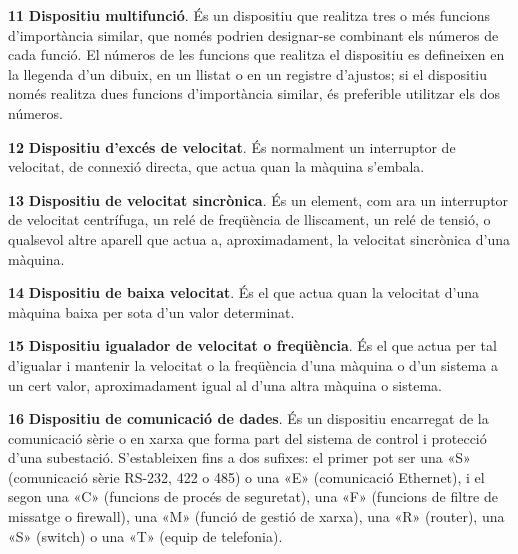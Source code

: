 \begin{multicols}{2}
\begin{list}{}
\item[\textbf{11}]  
\textbf{Dispositiu multifunció}. És un dispositiu que realitza tres o més funcions d'importància similar, que només podrien designar-se combinant els números de cada funció. El números de les funcions que realitza el dispositiu es defineixen en la llegenda d'un dibuix, en un llistat o en un registre d'ajustos; si el dispositiu només realitza dues funcions d'importància similar, és preferible utilitzar els dos números.

\item[\textbf{12}]   
\textbf{Dispositiu d'excés de velocitat}. És normalment un
interruptor de velocitat, de connexió directa, que
actua quan la màquina  s'embala.

\item[\textbf{13}]   
\textbf{Dispositiu de velocitat sincrònica}. És un element, com ara un interruptor de
velocitat centrífuga, un relé de freqüència de lliscament, un relé
de tensió, o qualsevol altre aparell que actua a, aproximadament, la
velocitat sincrònica d'una màquina.


\item[\textbf{14}]   
\textbf{Dispositiu de baixa velocitat}. És el que actua quan la velocitat d'una màquina baixa per sota d'un valor determinat.

\item[\textbf{15}]  
\textbf{Dispositiu igualador de velocitat o freqüència}. És el que
actua per tal d'igualar i mantenir la velocitat o la  freqüència
d'una màquina o d'un sistema a un cert valor, aproximadament igual
al  d'una altra màquina o sistema.

\item[\textbf{16}]  
\textbf{Dispositiu de comunicació de dades}. És un dispositiu encarregat de la comunicació sèrie o en xarxa que forma part del  sistema de control i protecció d'una subestació. S'estableixen fins a dos sufixes: el primer pot ser una «S» (comunicació sèrie RS-232, 422 o 485) o una «E» (comunicació Ethernet), i el segon una «C» (funcions de procés de seguretat), una «F» (funcions de filtre de missatge o firewall), una «M» (funció de gestió de xarxa), una  «R» (router), una «S» (switch) o una «T» (equip de telefonia).


\end{list}
\end{multicols}
